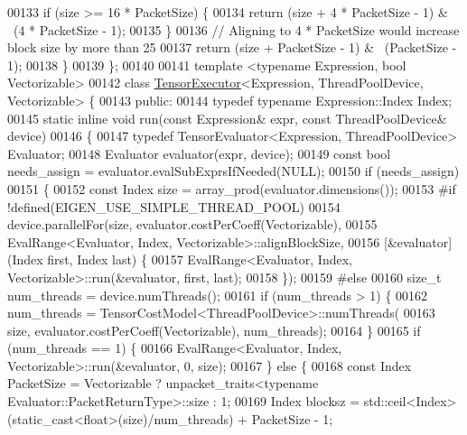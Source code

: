 \begin{DoxyCode}
00133     \textcolor{keywordflow}{if} (size >= 16 * PacketSize) \{
00134       \textcolor{keywordflow}{return} (size + 4 * PacketSize - 1) & ~(4 * PacketSize - 1);
00135     \}
00136     \textcolor{comment}{// Aligning to 4 * PacketSize would increase block size by more than 25%
00137     \textcolor{keywordflow}{return} (size + PacketSize - 1) & ~(PacketSize - 1);
00138   \}
00139 \};
00140 
00141 \textcolor{keyword}{template} <\textcolor{keyword}{typename} Expression, \textcolor{keywordtype}{bool} Vectorizable>
00142 \textcolor{keyword}{class }\hyperlink{class_tensor_executor}{TensorExecutor}<Expression, ThreadPoolDevice, Vectorizable> \{
00143  \textcolor{keyword}{public}:
00144   \textcolor{keyword}{typedef} \textcolor{keyword}{typename} Expression::Index Index;
00145   \textcolor{keyword}{static} \textcolor{keyword}{inline} \textcolor{keywordtype}{void} run(\textcolor{keyword}{const} Expression& expr, \textcolor{keyword}{const} ThreadPoolDevice& device)
00146   \{
00147     \textcolor{keyword}{typedef} TensorEvaluator<Expression, ThreadPoolDevice> Evaluator;
00148     Evaluator evaluator(expr, device);
00149     \textcolor{keyword}{const} \textcolor{keywordtype}{bool} needs\_assign = evaluator.evalSubExprsIfNeeded(NULL);
00150     \textcolor{keywordflow}{if} (needs\_assign)
00151     \{
00152       \textcolor{keyword}{const} Index size = array\_prod(evaluator.dimensions());
00153 \textcolor{preprocessor}{#if !defined(EIGEN\_USE\_SIMPLE\_THREAD\_POOL)}
00154       device.parallelFor(size, evaluator.costPerCoeff(Vectorizable),
00155                          EvalRange<Evaluator, Index, Vectorizable>::alignBlockSize,
00156                          [&evaluator](Index first, Index last) \{
00157                            EvalRange<Evaluator, Index, Vectorizable>::run(&evaluator, first, last);
00158                          \});
00159 \textcolor{preprocessor}{#else}
00160       \textcolor{keywordtype}{size\_t} num\_threads = device.numThreads();
00161       \textcolor{keywordflow}{if} (num\_threads > 1) \{
00162         num\_threads = TensorCostModel<ThreadPoolDevice>::numThreads(
00163             size, evaluator.costPerCoeff(Vectorizable), num\_threads);
00164       \}
00165       \textcolor{keywordflow}{if} (num\_threads == 1) \{
00166         EvalRange<Evaluator, Index, Vectorizable>::run(&evaluator, 0, size);
00167       \} \textcolor{keywordflow}{else} \{
00168         \textcolor{keyword}{const} Index PacketSize = Vectorizable ? unpacket\_traits<typename Evaluator::PacketReturnType>::size
       : 1;
00169         Index blocksz = std::ceil<Index>(\textcolor{keyword}{static\_cast<}\textcolor{keywordtype}{float}\textcolor{keyword}{>}(size)/num\_threads) + PacketSize - 1;
}
\end{DoxyCode}
